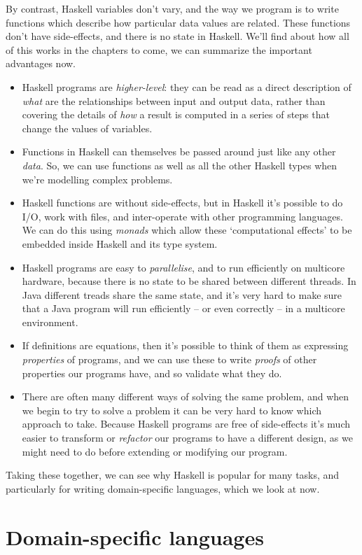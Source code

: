 By contrast, Haskell variables don't vary, and the way we program is to write functions which describe how particular data values are related. These functions don't have side-effects, and there is no state in Haskell. We'll find about how all of this works in the chapters to come, we can summarize the important advantages now.
\begin{itemize}
\item
Haskell programs are \emph{higher-level}: they can be read as a direct description of \emph{what} are the relationships between input and output data, rather than covering the details of \emph{how} a result is computed in a series of steps that change the values of variables.
\item
Functions in Haskell can themselves be passed around just like any other \emph{data}. So, we can use functions as well as all the other Haskell types when we're modelling complex problems.
\item
Haskell functions are without side-effects, but in Haskell it's possible to do I/O, work with files, and inter-operate with other programming languages. We can do this using \emph{monads} which allow these `computational effects' to be embedded inside Haskell and its type system.
\item
Haskell programs are easy to \emph{parallelise}, and to run efficiently on multicore hardware, because there is no state to be shared between different threads. In Java different treads share the same state, and it's very hard to make sure that a Java program will run efficiently -- or even correctly -- in a multicore environment.
\item
If definitions are equations, then it's possible to think of them as expressing \emph{properties} of programs, and we can use these to write \emph{proofs} of other properties our programs have, and so validate what they do.
\item
There are often many different ways of solving the same problem, and when we begin to try to solve a problem it can be very hard to know which approach to take. Because Haskell programs are free of side-effects it's much easier to transform or \emph{refactor} our programs to have a different design, as we might need to do before extending or modifying our program.
\end{itemize} 
Taking these together, we can see why Haskell is popular for many tasks, and particularly for writing domain-specific languages, which we look at now.


\section{Domain-specific languages}

